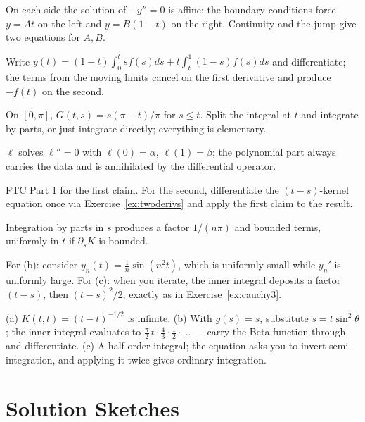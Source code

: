\documentclass{essay}
\begin{document}
\begin{description}[leftmargin=0pt, itemsep=4pt]
  \item[\ref{ex:green-construct}.] On each side the solution of $-y''=0$ is affine; the boundary conditions force $y = At$ on the left and $y = B(1-t)$ on the right. Continuity and the jump give two equations for $A, B$.
  \item[\ref{ex:green-verify}.] Write $y(t) = (1-t)\int_0^t s f(s) ds + t \int_t^1 (1-s) f(s) ds$ and differentiate; the terms from the moving limits cancel on the first derivative and produce $-f(t)$ on the second.
  \item[\ref{ex:eigen}.] On $[0,\pi]$, $G(t,s) = s(\pi - t)/\pi$ for $s \le t$. Split the integral at $t$ and integrate by parts, or just integrate directly; everything is elementary.
  \item[\ref{ex:inhomog-bc}.] $\ell$ solves $\ell'' = 0$ with $\ell(0) = \alpha$, $\ell(1) = \beta$; the polynomial part always carries the data and is annihilated by the differential operator.
  \item[\ref{ex:bootstrap}.] FTC Part 1 for the first claim. For the second, differentiate the $(t-s)$-kernel equation once via Exercise~\ref{ex:twoderivs} and apply the first claim to the result.
  \item[\ref{ex:illposed}.] Integration by parts in $s$ produces a factor $1/(n\pi)$ and bounded terms, uniformly in $t$ if $\partial_s K$ is bounded.
  \item[\ref{ex:contraction}.] For (b): consider $y_n(t) = \frac{1}{n}\sin(n^2 t)$, which is uniformly small while $y_n'$ is uniformly large. For (c): when you iterate, the inner integral deposits a factor $(t - s)$, then $(t-s)^2/2$, exactly as in Exercise~\ref{ex:cauchy3}.
  \item[\ref{ex:abel}.] (a) $K(t,t) = (t-t)^{-1/2}$ is infinite. (b) With $g(s) = s$, substitute $s = t\sin^2\theta$; the inner integral evaluates to $\tfrac{\pi}{2}\, t \cdot \frac{4}{3}\cdot\frac{1}{2}\cdot\ldots$ --- carry the Beta function through and differentiate. (c) A half-order integral; the equation asks you to invert semi-integration, and applying it twice gives ordinary integration.
\end{description}

\clearpage
\section{Solution Sketches}
\end{document}
